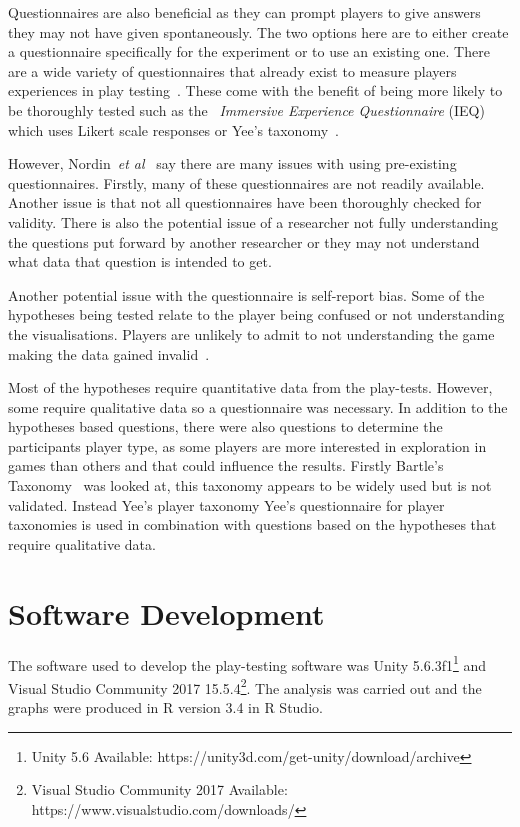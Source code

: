 \documentclass[journal]{IEEEtran}
\begin{document}
	Questionnaires are also beneficial as they can prompt players to give answers they may not have given spontaneously. The two options here are to either create a questionnaire specifically for the experiment or to use an existing one. There are a wide variety of questionnaires that already exist to measure players experiences in play testing~\cite{nordin2014, Jennett2008}. These come with the benefit of being more likely to be thoroughly tested such as the~\textit{ Immersive Experience Questionnaire} (IEQ) which uses Likert scale responses or Yee's taxonomy~\cite{nordin2014, Jennett2008, Yee2006, Yee2012}.
	
	However, Nordin~\textit{et al}~\cite{nordin2014} say there are many issues with using pre-existing questionnaires. Firstly, many of these questionnaires are not readily available. Another issue is that not all questionnaires have been thoroughly checked for validity. There is also the potential issue of a researcher not fully understanding the questions put forward by another researcher or they may not understand what data that question is intended to get.
	
	Another potential issue with the questionnaire is self-report bias. Some of the hypotheses being tested relate to the player being confused or not understanding the visualisations. Players are unlikely to admit to not understanding the game making the data gained invalid~\cite{donaldson2002}.
	
	Most of the hypotheses require quantitative data from the play-tests. However, some require qualitative data so a questionnaire was necessary.  In addition to the hypotheses based questions, there were also questions to determine the participants player type, as some players are more interested in exploration in games than others and that could influence the results. 
	Firstly Bartle's Taxonomy~\cite{Bartle1996} was looked at, this taxonomy appears to be widely used but is not validated. Instead Yee's player taxonomy 
	Yee's questionnaire for player taxonomies is used in combination with questions based on the hypotheses that require qualitative data. 
	
	\section{Software Development} \label{softdev}
	The software used to develop the play-testing software was Unity 5.6.3f1\footnote[3]{Unity 5.6 Available: https://unity3d.com/get-unity/download/archive} and Visual Studio Community 2017  15.5.4\footnote[4]{Visual Studio Community 2017 Available: https://www.visualstudio.com/downloads/}.  The analysis was carried out and the graphs were produced in R version 3.4 in R Studio.
	
\end{document}
